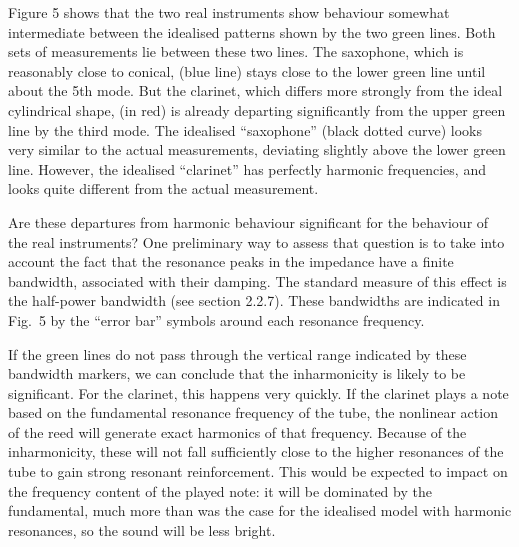 
  Figure 5 shows that the two real instruments show behaviour somewhat 
  intermediate between the idealised patterns shown by the two green lines. 
  Both sets of measurements lie between these two lines. The saxophone, which 
  is reasonably close to conical, (blue line) stays close to the lower green 
  line until about the 5th mode. But the clarinet, which differs more strongly 
  from the ideal cylindrical shape, (in red) is already departing significantly 
  from the upper green line by the third mode. The idealised ``saxophone'' 
  (black dotted curve) looks very similar to the actual measurements, deviating 
  slightly above the lower green line. However, the idealised ``clarinet'' has 
  perfectly harmonic frequencies, and looks quite different from the actual 
  measurement. 

  Are these departures from harmonic behaviour significant for the behaviour of 
  the real instruments? One preliminary way to assess that question is to take 
  into account the fact that the resonance peaks in the impedance have a finite 
  bandwidth, associated with their damping. The standard measure of this effect 
  is the half-power bandwidth (see section 2.2.7). These bandwidths are 
  indicated in Fig.\ 5 by the “error bar” symbols around each resonance 
  frequency. 

  If the green lines do not pass through the vertical range indicated by these 
  bandwidth markers, we can conclude that the inharmonicity is likely to be 
  significant. For the clarinet, this happens very quickly. If the clarinet 
  plays a note based on the fundamental resonance frequency of the tube, the 
  nonlinear action of the reed will generate exact harmonics of that frequency. 
  Because of the inharmonicity, these will not fall sufficiently close to the 
  higher resonances of the tube to gain strong resonant reinforcement. This 
  would be expected to impact on the frequency content of the played note: it 
  will be dominated by the fundamental, much more than was the case for the 
  idealised model with harmonic resonances, so the sound will be less bright. 

